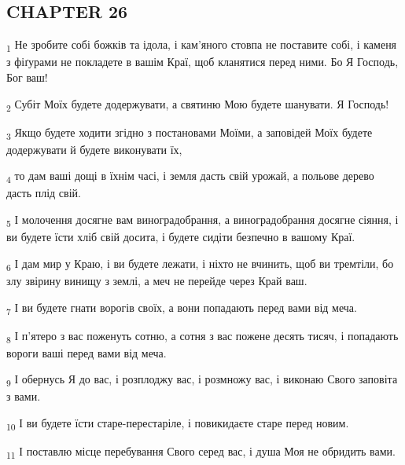 \subsection{CHAPTER 26}
\begin{tcolorbox}
\textsubscript{1} Не зробите собі божків та ідола, і кам'яного стовпа не поставите собі, і каменя з фіґурами не покладете в вашім Краї, щоб кланятися перед ними. Бо Я Господь, Бог ваш!
\end{tcolorbox}
\begin{tcolorbox}
\textsubscript{2} Субіт Моїх будете додержувати, а святиню Мою будете шанувати. Я Господь!
\end{tcolorbox}
\begin{tcolorbox}
\textsubscript{3} Якщо будете ходити згідно з постановами Моїми, а заповідей Моїх будете додержувати й будете виконувати їх,
\end{tcolorbox}
\begin{tcolorbox}
\textsubscript{4} то дам ваші дощі в їхнім часі, і земля дасть свій урожай, а польове дерево дасть плід свій.
\end{tcolorbox}
\begin{tcolorbox}
\textsubscript{5} І молочення досягне вам виноградобрання, а виноградобрання досягне сіяння, і ви будете їсти хліб свій досита, і будете сидіти безпечно в вашому Краї.
\end{tcolorbox}
\begin{tcolorbox}
\textsubscript{6} І дам мир у Краю, і ви будете лежати, і ніхто не вчинить, щоб ви тремтіли, бо злу звірину винищу з землі, а меч не перейде через Край ваш.
\end{tcolorbox}
\begin{tcolorbox}
\textsubscript{7} І ви будете гнати ворогів своїх, а вони попадають перед вами від меча.
\end{tcolorbox}
\begin{tcolorbox}
\textsubscript{8} І п'ятеро з вас поженуть сотню, а сотня з вас пожене десять тисяч, і попадають вороги ваші перед вами від меча.
\end{tcolorbox}
\begin{tcolorbox}
\textsubscript{9} І обернусь Я до вас, і розплоджу вас, і розмножу вас, і виконаю Свого заповіта з вами.
\end{tcolorbox}
\begin{tcolorbox}
\textsubscript{10} І ви будете їсти старе-перестаріле, і повикидаєте старе перед новим.
\end{tcolorbox}
\begin{tcolorbox}
\textsubscript{11} І поставлю місце перебування Свого серед вас, і душа Моя не обридить вами.
\end{tcolorbox}
